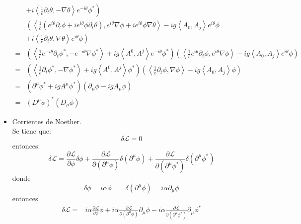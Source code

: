 \begin{itemize}
\begin{align*}
        &\left.+i \left\langle \frac{1}{c}\partial_{t}\theta ,-\nabla \theta  \right\rangle e^{-i\theta}\phi^*\right)\\
        &\left(\left\langle \frac{1}{c}(e^{i\theta}\partial_{t}\phi+ie^{i\theta}\phi\partial_{t}\theta ), e^{i\theta}\nabla\phi+ie^{i\theta}\phi\nabla\theta \right\rangle -ig \left\langle A_0,A_j \right\rangle e^{i\theta} \phi \right.\\
        &\left.+i \left\langle \frac{1}{c}\partial_{t}\theta ,\nabla \theta  \right\rangle e^{i\theta}\phi\right)\\
        =&\left(\left\langle\frac{1}{c}e^{-i\theta}\partial_t \phi^*, -e^{-i\theta}\nabla \phi^* \right\rangle+ig\left\langle A^0,A^j \right\rangle e^{-i\theta} \phi^*\right) \left(\left\langle\frac{1}{c}e^{i\theta}\partial_t \phi, e^{i\theta}\nabla \phi \right\rangle-ig\left\langle A_0,A_j \right\rangle e^{i\theta} \phi\right)\\
        =&\left(\left\langle\frac{1}{c}\partial_t \phi^*,- \nabla \phi^* \right\rangle+ig\left\langle A^0,A^j \right\rangle\phi^*\right) \left(\left\langle\frac{1}{c}\partial_t \phi,\nabla \phi \right\rangle-ig\left\langle A_0,A_j \right\rangle\phi\right)\\
        =&\left(\partial^\mu \phi^* +igA^\mu \phi^*\right)\left(\partial_\mu \phi - ig A_\mu \phi\right)\\
        =&\left(D^\mu \phi\right)^* \left(D_\mu \phi\right)
    \end{align*}
    \item Corrientes de Noether.\\
    Se tiene que:
    \begin{equation*}
        \delta \mathcal{L}=0
    \end{equation*}
    entonces:
    \begin{equation*}
        \delta \mathcal{L} = \frac{\partial \mathcal{L}}{\partial \phi} \delta \phi + \frac{\partial \mathcal{L}}{\partial (\partial^\mu \phi)} \delta (\partial^\mu \phi)  +\frac{\partial \mathcal{L}}{\partial (\partial^\mu {\phi}^*)} \delta (\partial^\mu {\phi}^*)
    \end{equation*}
    donde \begin{equation*}
        \delta \phi = i\alpha \phi \qquad \delta (\partial^\mu\phi) = i\alpha \partial_\mu  \phi
    \end{equation*}
    entonces\begin{align*}
        \delta \mathcal{L} =& i\alpha \frac{\partial \mathcal{L}}{\partial \phi} \phi + i\alpha \frac{\partial \mathcal{L}}{\partial (\partial^\mu \phi)} \partial_\mu \phi - i\alpha \frac{\partial \mathcal{L}}{\partial (\partial^\mu {\phi}^*)} \partial_\mu {\phi}^*\\

\end{align*}
\end{itemize}
